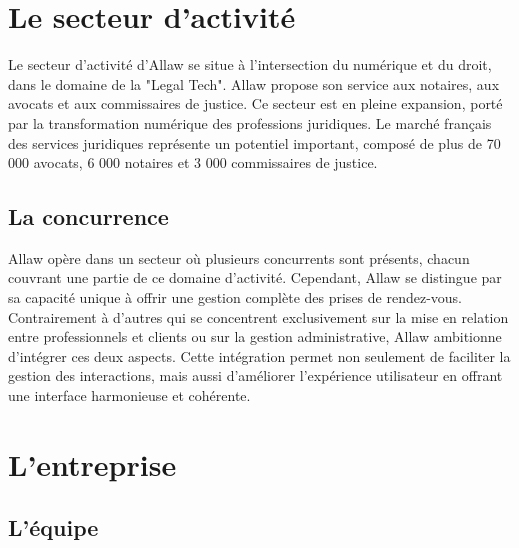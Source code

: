 \section{Le secteur d'activité}
Le secteur d'activité d'Allaw se situe à l'intersection du numérique et du
droit, dans le domaine de la "Legal Tech". Allaw propose son service aux
notaires, aux avocats et aux commissaires de justice. Ce secteur est en pleine
expansion, porté par la transformation numérique des professions juridiques.
Le marché français des services juridiques représente un potentiel important,
composé de plus de 70 000 avocats, 6 000 notaires et 3 000 commissaires de
justice.

\subsection{La concurrence}
Allaw opère dans un secteur où plusieurs concurrents sont présents, chacun
couvrant une partie de ce domaine d'activité. Cependant, Allaw se distingue
par sa capacité unique à offrir une gestion complète des prises de rendez-vous.
Contrairement à d'autres qui se concentrent exclusivement sur la mise en
relation entre professionnels et clients ou sur la gestion administrative, Allaw
ambitionne d'intégrer ces deux aspects. Cette intégration permet non seulement
de faciliter la gestion des interactions, mais aussi d'améliorer l'expérience
utilisateur en offrant une interface harmonieuse et cohérente.


\section{L'entreprise}

\subsection{L'équipe}


